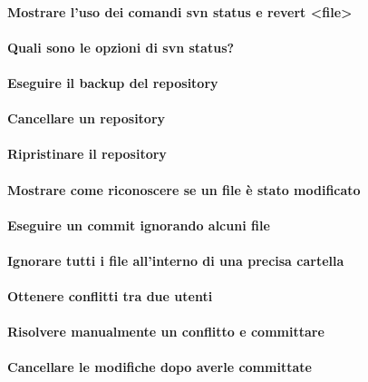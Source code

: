 \documentclass[a4paper]{article}
\begin{document}
	\paragraph{Mostrare l'uso dei comandi svn status e revert <file>}
	
	\paragraph{Quali sono le opzioni di svn status?}
	
	\paragraph{Eseguire il backup del repository}
	
	\paragraph{Cancellare un repository}
	
	\paragraph{Ripristinare il repository}
	
	\paragraph{Mostrare come riconoscere se un file è stato modificato}
	
	\paragraph{Eseguire un commit ignorando alcuni file}
	
	\paragraph{Ignorare tutti i file all'interno di una precisa cartella}
	
	\paragraph{Ottenere conflitti tra due utenti}
	
	\paragraph{Risolvere manualmente un conflitto e committare}
	
	\paragraph{Cancellare le modifiche dopo averle committate}
	
\end{document}
